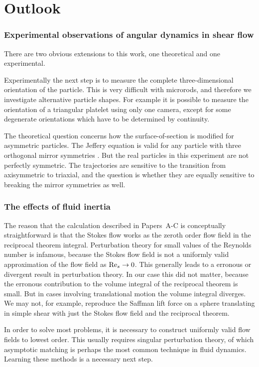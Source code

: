 \documentclass[thesis.tex]{subfiles}
\begin{document}
\section{Outlook}

\subsubsection{Experimental observations of angular dynamics in shear flow}
There are two obvious extensions to this work, one theoretical and one experimental.

Experimentally the next step is to measure the complete three-dimensional orientation of the particle. This is very difficult with microrods, and therefore we investigate alternative particle shapes. For example it is possible to measure the orientation of a triangular platelet using only one camera, except for some degenerate orientations which have to be determined by continuity.

The theoretical question concerns how the surface-of-section is modified for asymmetric particles. The Jeffery equation is valid for any particle with three orthogonal mirror symmetries \cite{brenner1964}. But the real particles in this experiment are not perfectly symmetric. The trajectories are sensitive to the transition from axisymmetric to triaxial, and the question is whether they are equally sensitive to breaking the mirror symmetries as well. 

\subsubsection{The effects of fluid inertia}
The reason that the calculation described in Papers~A-C is conceptually straightforward is that the Stokes flow works as the zeroth order flow field in the reciprocal theorem integral. Perturbation theory for small values of the Reynolds number is infamous, because the Stokes flow field is not a uniformly valid approximation of the flow field as $\textrm{Re}_s\to0$. This generally leads to a erronous or divergent result in perturbation theory. In our case this did not matter, because the erronous contribution to the volume integral of the reciprocal theorem is small. But in cases involving translational motion the volume integral diverges. We may not, for example, reproduce the Saffman lift force on a sphere translating in simple shear with just the Stokes flow field and the reciprocal theorem.

In order to solve most problems, it is necessary to construct uniformly valid flow fields to lowest order. This usually requires singular perturbation theory, of which asymptotic matching is perhaps the most common technique in fluid dynamics. Learning these methods is a necessary next step.
\end{document}
